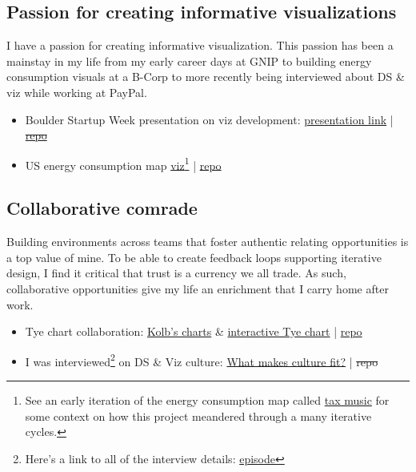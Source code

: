 \documentclass[11pt]{article}
\begin{document}
\subsection{Passion for creating informative visualizations}\label{sec:culture}
I have a passion for creating informative visualization. This passion has been a mainstay in my life from my early career days at GNIP to building energy consumption visuals at a B-Corp to more recently being interviewed about DS \& viz while working at PayPal. 

\begin{itemize}
	\item Boulder Startup Week presentation on viz development:  \href{https://blehman.github.io/2015-05-13\_BSW\_DataViz\_Lecture/\#/}{presentation link} | \sout{ \href{https://github.com/blehman/2015-05-13_BSW_DataViz_Lecture/tree/master}{repo} }
	\item US energy consumption map \href{https://blehman.github.io/wmo_map/}{viz}\footnote{See an early iteration of the energy consumption map called \href{https://blehman.github.io/tax_story/tax_sounds/}{tax music} for some context on how this project meandered through a many iterative cycles.} |  \href{https://github.com/blehman/wmo_map/tree/gh-pages}{repo} 
	
\end{itemize}


\subsection{Collaborative comrade}\label{sec:learner}
Building environments across teams that foster authentic relating opportunities is a top value of mine. To be able to create feedback loops supporting iterative design, I find it critical that trust is a currency we all trade. As such, collaborative opportunities give my life an enrichment that I carry home after work.  
 \begin{itemize}
 	\item Tye chart collaboration:  \href{https://github.com/twitterdev/Gnip-Trend-Detection}{Kolb's charts} \& \href{https://blehman.github.io/trend\_detection\_graph/}{interactive Tye chart} | \href{https://github.com/blehman/trend\_detection\_graph}{repo}
	\item I was interviewed\footnote{Here's a link to all of the interview details: \href{https://powderkeg.com/the-power-of-data-science-and-visualization-with-brian-lehman-of-honey/}{episode}} on DS \& Viz culture:  \href{https://www.youtube.com/watch?v=uIOiEL5aUe0&t=20m57s}{What makes culture fit?}  | \sout{repo}
 \end{itemize}
\end{document}

